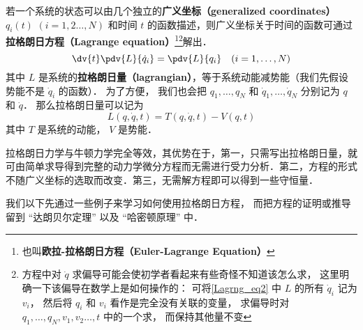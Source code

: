 

若一个系统的状态可以由几个独立的\textbf{广义坐标（generalized coordinates）} $q_i(t)$ $(i=1,2\dots,N)$ 和时间 $t$ 的函数描述，则广义坐标关于时间的函数可通过\textbf{拉格朗日方程（Lagrange equation）}\footnote{也叫\textbf{欧拉-拉格朗日方程（Euler-Lagrange Equation）}}\footnote{方程中对 $\dot q$ 求偏导可能会使初学者看起来有些奇怪不知道该怎么求， 这里明确一下该偏导在数学上是如何操作的： 可将\autoref{Lagrng_eq2} 中 $L$ 的所有 $\dot q_i$ 记为 $v_i$， 然后将 $q_i$ 和 $v_i$ 看作是完全没有关联的变量， 求偏导时对 $q_1,\dots, q_N, v_1, v_2\dots,t$ 中的一个求， 而保持其他量不变}解出．
\begin{equation}\label{Lagrng_eq1}
\dv{t} \pdv{L}{\dot q_i} = \pdv{L}{q_i}
\quad (i=1,\dots,N)
\end{equation}
其中 $L$ 是系统的\textbf{拉格朗日量（lagrangian）}，等于系统动能减势能（我们先假设势能不是 $\dot q_i$ 的函数）． 为了方便， 我们也会把 $q_1, \dots, q_N$ 和 $\dot q_1,\dots,\dot q_N$ 分别记为 $q$ 和 $\dot q$． 那么拉格朗日量可以记为
\begin{equation}\label{Lagrng_eq2}
L(q, \dot q, t) = T(q, \dot q, t) - V(q, t)
\end{equation}
其中 $T$ 是系统的动能， $V$ 是势能．


拉格朗日力学与牛顿力学完全等效，其优势在于，第一，只需写出拉格朗日量，就可由简单求导得到完整的动力学微分方程而无需进行受力分析．第二，方程的形式不随广义坐标的选取而改变．第三，无需解方程即可以得到一些守恒量．

我们以下先通过一些例子来学习如何使用拉格朗日方程， 而把方程的证明或推导留到 “达朗贝尔定理” 以及 “哈密顿原理” 中．

